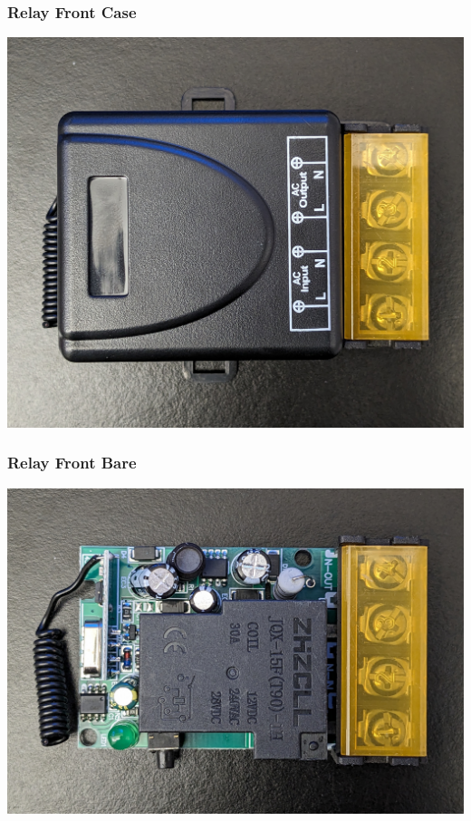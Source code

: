 \documentclass{beamer}
\begin{document}
\begin{frame}
\frametitle{Relay Front Case}
  \includegraphics[width=\textwidth]{../Pics/device/relay_front_case.jpg}
\end{frame}

\begin{frame}
\frametitle{Relay Front Bare}
  \includegraphics[width=\textwidth]{../Pics/device/relay_front_bare.jpg}
\end{frame}
\end{document}
